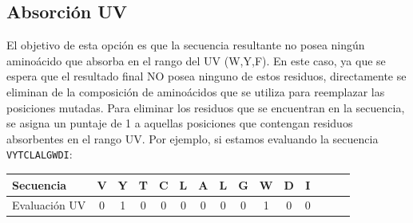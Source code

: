 \subsection{Absorción UV}

El objetivo de esta opción es que la secuencia resultante no posea ningún aminoácido que absorba en el rango del UV (W,Y,F).
En este caso, ya que se espera que el resultado final NO posea ninguno de estos residuos, directamente se eliminan de la composición de aminoácidos que se utiliza para reemplazar las posiciones mutadas. 
Para eliminar los residuos que se encuentran en la secuencia, se asigna un puntaje de 1 a aquellas posiciones que contengan residuos absorbentes en el rango UV. 
Por ejemplo, si estamos evaluando la secuencia \texttt{VYTCLALGWDI}:


\begin{center}
\begin{tabular}{lcccccccccccccc} 
\hline
Secuencia 	& \textbf{V} & \textbf{Y} & \textbf{T} & \textbf{C} & \textbf{L} & \textbf{A} & \textbf{L} & \textbf{G} & \textbf{W} & \textbf{D} & \textbf{I}\\ \hline
Evaluación UV 	& 0 & 1 & 0 & 0 & 0 & 0 & 0 & 0 & 1 & 0 & 0  \\ \hline
\end{tabular}
\end{center}











% 
% 
% 
% 
% 







